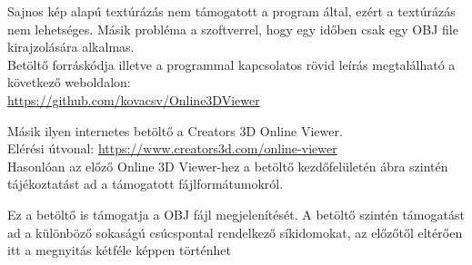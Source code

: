Sajnos kép alapú textúrázás nem támogatott a program által, ezért a textúrázás nem lehetséges. Másik probléma a szoftverrel, hogy egy időben csak egy OBJ file kirajzolására alkalmas.\\

Betöltő forráskódja illetve a programmal kapcsolatos rövid leírás megtalálható a következő weboldalon:\\
\url{https://github.com/kovacsv/Online3DViewer}
\newpage
{}

Másik ilyen internetes betöltő a Creators 3D Online Viewer.\cite{creators2018creators3d}\\
Elérési útvonal: \url{https://www.creators3d.com/online-viewer}\\

Hasonlóan az előző Online 3D Viewer-hez a betöltő kezdőfelületén  ábra szintén tájékoztatást ad a támogatott fájlformátumokról.

Ez a betöltő is támogatja a OBJ fájl megjelenítését. A betöltő szintén támogatást ad a különböző sokaságú csúcspontal rendelkező síkidomokat, az előzőtől eltérően itt a megnyitás kétféle képpen történhet

